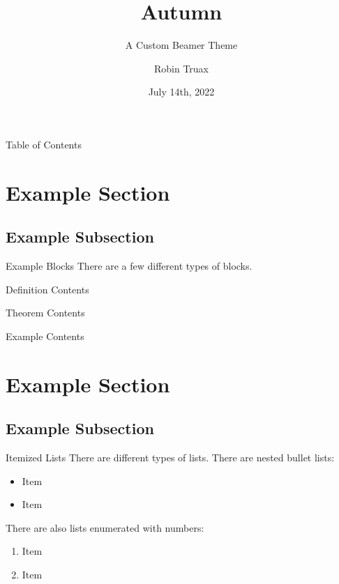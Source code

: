 \documentclass[compress]{beamer}
\title{Autumn}
\subtitle{A Custom Beamer Theme \subtitleline}
\author{Robin Truax}
\institute{Stanford University}
\date{July 14th, 2022}
\begin{document}
\begin{frame}[plain]
\titlepage
\end{frame}

\begin{frame}{Table of Contents}
    \tableofcontents
\end{frame}

\section{Example Section}
\subsection{Example Subsection}
\begin{frame}{Example Blocks}
There are a few different types of blocks.
\begin{block}{Definition}
Contents
\end{block}
\begin{alertblock}{Theorem}
Contents
\end{alertblock}
\begin{exampleblock}{Example}
Contents
\end{exampleblock}
\end{frame}

\section{Example Section}
\subsection{Example Subsection}
\begin{frame}{Itemized Lists}
There are different types of lists. There are nested bullet lists: 
\begin{itemize}
    \item Item
    \item Item
\end{itemize}
There are also lists enumerated with numbers: 
\begin{enumerate}
    \item Item
    \item Item
\end{enumerate}
\end{frame}
\end{document}
